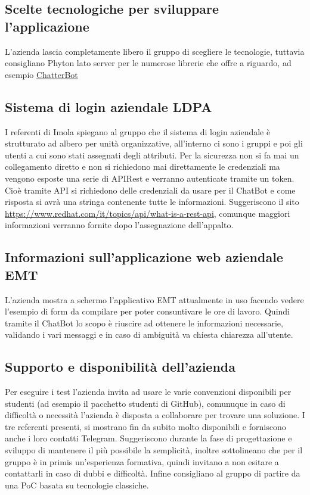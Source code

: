\documentclass[12pt, a4paper,table]{article}
\begin{document}
        \subsection{Scelte tecnologiche per sviluppare l'applicazione}
        L'azienda lascia completamente libero il gruppo di scegliere le tecnologie, tuttavia 
        consigliano Phyton lato server per le numerose librerie che offre a riguardo, 
		ad esempio \href{https://chatterbot.readthedocs.io/en/stable/}{ChatterBot}

		\subsection{Sistema di login aziendale LDPA}
		I referenti di Imola spiegano al gruppo che il sistema di login aziendale è strutturato ad albero 
		per unità organizzative, all'interno ci sono i gruppi e poi gli utenti a cui sono stati assegnati degli attributi. 
		Per la sicurezza non si fa mai un collegamento diretto e non si richiedono mai direttamente le credenziali
		ma vengono esposte una serie di APIRest e verranno autenticate tramite un token. 
		Cioè tramite API si richiedono delle credenziali da usare per il ChatBot e come risposta si avrà 
		una stringa contenente tutte le informazioni. Suggeriscono il sito 
		\href{https://www.redhat.com/it/topics/api/what-is-a-rest-api}{https://www.redhat.com/it/topics/api/what-is-a-rest-api},
		comunque maggiori informazioni verranno fornite dopo l'assegnazione dell'appalto.
		
		\subsection{Informazioni sull'applicazione web aziendale EMT}
		L'azienda mostra a schermo l'applicativo EMT attualmente in uso facendo vedere l'esempio di form 
		da compilare per poter consuntivare le ore di lavoro. Quindi tramite il ChatBot lo scopo è riuscire 
		ad ottenere le informazioni necessarie, validando i vari messaggi e in caso di ambiguità va chiesta
		chiarezza all'utente.

		\subsection{Supporto e disponibilità dell'azienda}
		Per eseguire i test l'azienda invita ad usare le varie convenzioni disponibili per studenti 
		(ad esempio il pacchetto studenti di GitHub), comunuque in caso di difficoltà o necessità 
		l'azienda è disposta a collaborare per trovare una soluzione.
		I tre referenti presenti, si mostrano fin da subito molto disponibili e forniscono
		anche i loro contatti Telegram. \newline
		Suggeriscono durante la fase di progettazione e sviluppo di mantenere il più possibile 
		la semplicità, inoltre sottolineano che per il gruppo è in primis un'esperienza formativa, 
		quindi invitano a non esitare a contattarli in caso di dubbi e difficoltà. 
		Infine consigliano al gruppo di partire da una PoC basata su tecnologie classiche.
		
\end{document}
